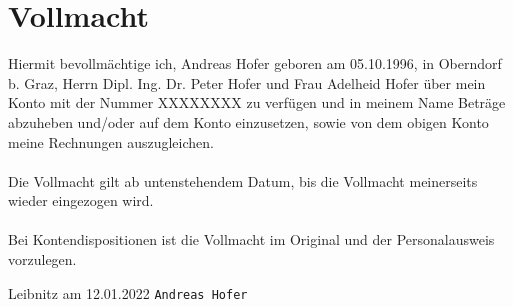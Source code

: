 \documentclass{article}
\begin{document}
	\section*{Vollmacht}
	Hiermit bevollmächtige ich, Andreas Hofer geboren am 05.10.1996, in Oberndorf b. Graz, Herrn Dipl. Ing. Dr. Peter Hofer und Frau Adelheid Hofer über mein Konto mit der Nummer XXXXXXXX zu verfügen und in meinem Name Beträge abzuheben und/oder auf dem Konto einzusetzen, sowie von dem obigen Konto meine Rechnungen auszugleichen. \\ \\
	Die Vollmacht gilt ab untenstehendem Datum, bis die Vollmacht meinerseits wieder eingezogen wird. \\ \\
	Bei Kontendispositionen ist die Vollmacht im Original und der Personalausweis vorzulegen.

	\vspace*{\fill}
	Leibnitz am 12.01.2022 \hspace{8cm} \texttt{\small{Andreas Hofer}}
	\newpage
\end{document}
